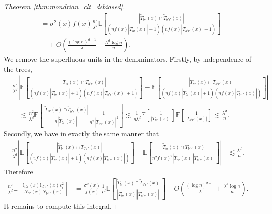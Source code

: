 \documentclass[11pt,lof]{puthesis}
\newcommand{\E}{\ensuremath{\mathbb{E}}}
\newcommand{\I}{\ensuremath{\mathbb{I}}}
\theoremstyle{break}
\theoremstyle{proof}
\newtheorem{proof}{Proof}
\begin{document}
\begin{proof}[Theorem~\ref{thm:mondrian_clt_debiased}]
\begin{align*}
    &=
    \sigma^2(x)
    f(x)
    \frac{n^2}{\lambda^d}
    \E \left[
      \frac{|\tilde T_{b r}(x) \cap \tilde T_{b' r'}(x)|}
      {(n f(x) |\tilde T_{b r}(x)|+1)(n f(x) |\tilde T_{b' r'}(x)|+1)}
    \right] \\
    &\quad+
    O \left(
      \frac{(\log n)^{d+1}}{\lambda}
      + \frac{\lambda^d \log n}{n}
    \right).
  \end{align*}
  We remove the superfluous units in the denominators.
  Firstly, by independence of the trees,
  \begin{align*}
    & \frac{n^2}{\lambda^d}
    \left|
      \E \left[
        \frac{|\tilde T_{b r}(x) \cap \tilde T_{b' r'}(x)|}
        {(n f(x) |\tilde T_{b r}(x)|+1)(n f(x) |\tilde T_{b' r'}(x)|+1)}
      \right]
      - \E \left[
        \frac{|\tilde T_{b r}(x) \cap \tilde T_{b' r'}(x)|}
        {(n f(x) |\tilde T_{b r}(x)|+1)(n f(x) |\tilde T_{b' r'}(x)|)}
      \right]
    \right| \\
    &\quad\lesssim
    \frac{n^2}{\lambda^d}
    \E \left[
      \frac{|\tilde T_{b r}(x) \cap \tilde T_{b' r'}(x)|}
      {n |\tilde T_{b r}(x)|}
      \frac{1}
      {n^2 |\tilde T_{b' r'}(x)|^2}
    \right]
    \lesssim
    \frac{1}{n \lambda^d}
    \E \left[
      \frac{1}{|T_{b r}(x)|}
    \right]
    \E \left[
      \frac{1}{|T_{b' r'}(x)|}
    \right]
    \lesssim
    \frac{\lambda^d}{n}.
  \end{align*}
  Secondly, we have in exactly the same manner that
  \begin{align*}
    \frac{n^2}{\lambda^d}
    \left|
      \E \left[
        \frac{|\tilde T_{b r}(x) \cap T_{b' r'}(x)|}
        {(n f(x) |\tilde T_{b r}(x)|+1)(n f(x) |\tilde T_{b' r'}(x)|)}
      \right]
      - \E \left[
        \frac{|\tilde T_{b r}(x) \cap T_{b' r'}(x)|}
        {n^2 f(x)^2 |\tilde T_{b r}(x)| |\tilde T_{b' r'}(x)|}
      \right]
    \right|
    &\lesssim
    \frac{\lambda^d}{n}.
  \end{align*}
  Therefore
  \begin{align*}
    \frac{n^2}{\lambda^d}
    \E \left[
      \frac{\I_{i b r}(x) \I_{i b' r'}(x) \varepsilon_i^2}
      {N_{b r}(x) N_{b' r'}(x)}
    \right]
    &=
    \frac{\sigma^2(x)}{f(x)}
    \frac{1}{\lambda^d}
    \E \left[
      \frac{|\tilde T_{b r}(x) \cap \tilde T_{b' r'}(x)|}
      {|\tilde T_{b r}(x)| |\tilde T_{b' r'}(x)|}
    \right]
    + O \left(
      \frac{(\log n)^{d+1}}{\lambda}
      + \frac{\lambda^d \log n}{n}
    \right).
  \end{align*}
  It remains to compute this integral.

\end{proof}
\end{document}
